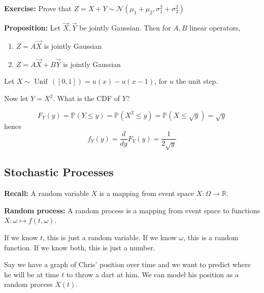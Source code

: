 \documentclass[12pt]{report}
\renewcommand{\P}{\mathbb{P}}
\newcommand{\R}{\mathbb{R}}
\newcommand{\Nc}{\mathcal{N}}
\DeclareMathOperator*{\Unif}{\text{Unif}\,}
\newcommand*{\tbf}[1]{\ifmmode\mathbf{#1}\else\textbf{#1}\fi}
\newenvironment*{exercise}[1][red]{
    \begin{tcolorbox}[
        parbox=false,
        colback=#1!5!white,
        colframe=#1!75!black,
        breakable
    ]}
    {\end{tcolorbox}}
\newenvironment*{proposition}[1][gray]{
    \begin{tcolorbox}[
        parbox=false,
        colback=#1!5!white,
        colframe=#1!75!black,
        breakable
    ]}
    {\end{tcolorbox}}
\begin{document}
\begin{exercise}
    \textbf{Exercise:} Prove that $Z = X + Y \sim \Nc(\mu_1 + \mu_2, \sigma_1^2 + \sigma_2^2)$
\end{exercise}

\begin{proposition}
    \textbf{Proposition:} Let $\vec X, \vec Y$ be jointly Gaussian. Then for $A, B$ linear operators, 
    \begin{enumerate}
        \item $Z = A\vec X$ is jointly Gaussian 
        \item $Z = A \vec X + B \vec Y$ is jointly Gaussian 
    \end{enumerate}
\end{proposition}

Let $X \sim \Unif([0, 1]) = u(x) - u(x - 1)$, for $u$ the unit step. 

\begin{center}
\end{center}

Now let $Y = X^2$. What is the CDF of $Y$? 

\[F_Y(y) = \P(Y \leq y) = \P(X^2 \leq y) = \P(X \leq \sqrt y) = \sqrt y\]
hence 
\[f_Y(y) = \frac{d}{dy} F_Y(y) = \frac{1}{2\sqrt y}\]

\subsection{Stochastic Processes}

\tbf{Recall:} A random variable $X$ is a mapping from event space $X: \Omega \to \R$. 

\tbf{Random process:} A random process is a mapping from event space to functions $X: \omega \mapsto f(t, \omega)$. 

If we know $t$, this is just a random variable. If we know $\omega$, this is a random function. If we know both, this is just a number.

Say we have a graph of Chris' position over time and we want to predict where he will be at time $t$ to throw a dart at him. We can model his position as a random process $X(t)$. 
\end{document}
